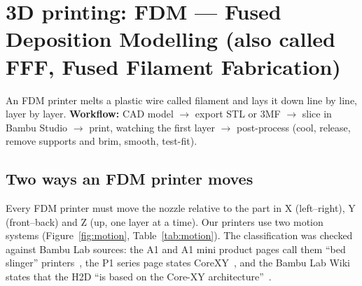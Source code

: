 \documentclass[11pt,a4paper]{report}
\begin{document}
\section{3D printing: FDM --- Fused Deposition Modelling (also called FFF, Fused Filament Fabrication)}
An FDM printer melts a plastic wire called filament and lays it down line by line, layer by layer.
\textbf{Workflow:} CAD model $\rightarrow$ export STL or 3MF $\rightarrow$ slice in Bambu Studio $\rightarrow$ print, watching the first layer $\rightarrow$ post-process (cool, release, remove supports and brim, smooth, test-fit).

\subsection{Two ways an FDM printer moves}
Every FDM printer must move the nozzle relative to the part in X (left--right), Y (front--back) and Z (up, one layer at a time). Our printers use two motion systems (Figure~\ref{fig:motion}, Table~\ref{tab:motion}). The classification was checked against Bambu Lab sources: the A1 and A1 mini product pages call them ``bed slinger'' printers~\cite{bambua1,bambua1mini}, the P1 series page states CoreXY~\cite{bambup1s}, and the Bambu Lab Wiki states that the H2D ``is based on the Core-XY architecture''~\cite{bambuh2dwiki}.
\end{document}
